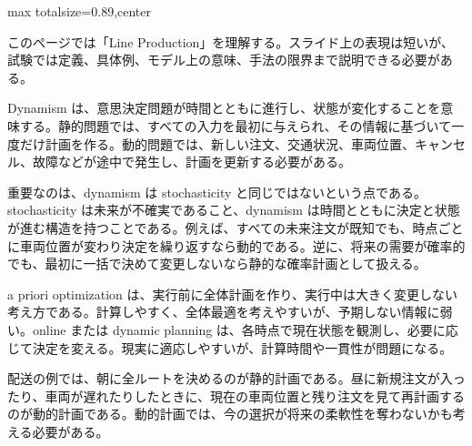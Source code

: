 \begin{minipage}[t]{0.58\textwidth}
\begin{adjustbox}{max totalsize={\textwidth}{0.89\textheight},center}
\begin{minipage}{\textwidth}\scriptsize
{}このページでは「Line Production」を理解する。スライド上の表現は短いが、試験では定義、具体例、モデル上の意味、手法の限界まで説明できる必要がある。\par
Dynamism は、意思決定問題が時間とともに進行し、状態が変化することを意味する。静的問題では、すべての入力を最初に与えられ、その情報に基づいて一度だけ計画を作る。動的問題では、新しい注文、交通状況、車両位置、キャンセル、故障などが途中で発生し、計画を更新する必要がある。\par
重要なのは、dynamism は stochasticity と同じではないという点である。stochasticity は未来が不確実であること、dynamism は時間とともに決定と状態が進む構造を持つことである。例えば、すべての未来注文が既知でも、時点ごとに車両位置が変わり決定を繰り返すなら動的である。逆に、将来の需要が確率的でも、最初に一括で決めて変更しないなら静的な確率計画として扱える。\par
a priori optimization は、実行前に全体計画を作り、実行中は大きく変更しない考え方である。計算しやすく、全体最適を考えやすいが、予期しない情報に弱い。online または dynamic planning は、各時点で現在状態を観測し、必要に応じて決定を変える。現実に適応しやすいが、計算時間や一貫性が問題になる。\par
配送の例では、朝に全ルートを決めるのが静的計画である。昼に新規注文が入ったり、車両が遅れたりしたときに、現在の車両位置と残り注文を見て再計画するのが動的計画である。動的計画では、今の選択が将来の柔軟性を奪わないかも考える必要がある。\par

\end{minipage}
\end{adjustbox}
\end{minipage}
